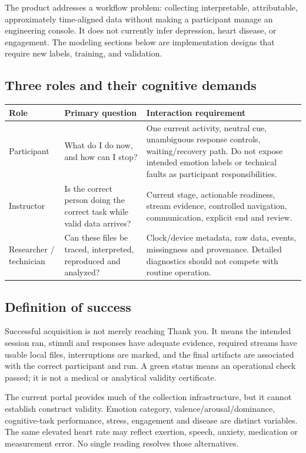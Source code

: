 \documentclass[11pt,a4paper]{article}
\begin{document}
The product addresses a workflow problem: collecting interpretable, attributable, approximately time-aligned data without making a participant manage an engineering console. It does not currently infer depression, heart disease, or engagement. The modeling sections below are implementation designs that require new labels, training, and validation.

\subsection{Three roles and their cognitive demands}
\begin{longtable}{@{}L{.19\textwidth}L{.35\textwidth}L{.39\textwidth}@{}}
\toprule Role & Primary question & Interaction requirement\\\midrule\endhead
Participant & What do I do now, and how can I stop? & One current activity, neutral cue, unambiguous response controls, waiting/recovery path. Do not expose intended emotion labels or technical faults as participant responsibilities.\\
Instructor & Is the correct person doing the correct task while valid data arrives? & Current stage, actionable readiness, stream evidence, controlled navigation, communication, explicit end and review.\\
Researcher / technician & Can these files be traced, interpreted, reproduced and analyzed? & Clock/device metadata, raw data, events, missingness and provenance. Detailed diagnostics should not compete with routine operation.\\
\bottomrule
\end{longtable}

\subsection{Definition of success}
Successful acquisition is not merely reaching Thank you. It means the intended session ran, stimuli and responses have adequate evidence, required streams have usable local files, interruptions are marked, and the final artifacts are associated with the correct participant and run. A green status means an operational check passed; it is not a medical or analytical validity certificate.

The current portal provides much of the collection infrastructure, but it cannot establish construct validity. Emotion category, valence/arousal/dominance, cognitive-task performance, stress, engagement and disease are distinct variables. The same elevated heart rate may reflect exertion, speech, anxiety, medication or measurement error. No single reading resolves those alternatives.
\end{document}
